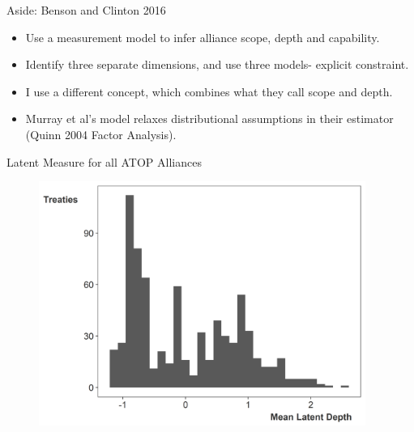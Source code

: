 \documentclass[12pt]{beamer}
\begin{document}


\begin{frame}{Aside: Benson and Clinton 2016}

\begin{itemize}
\item Use a measurement model to infer alliance scope, depth and capability. 
\item Identify three separate dimensions, and use three models- explicit constraint. 
\item I use a different concept, which combines what they call scope and depth. 
\item Murray et al's model relaxes distributional assumptions in their estimator (Quinn 2004 Factor Analysis). 
\end{itemize}


\end{frame}


\begin{frame}{Latent Measure for all ATOP Alliances}


\begin{figure}
	\centering
		\includegraphics[width=0.95\textwidth]{ld-hist-full.png}
\end{figure}


\end{frame}


\end{document}
